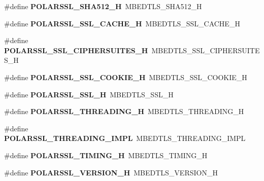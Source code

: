 \begin{DoxyCompactItemize}
\#define {\bfseries P\+O\+L\+A\+R\+S\+S\+L\+\_\+\+S\+H\+A512\+\_\+H}~M\+B\+E\+D\+T\+L\+S\+\_\+\+S\+H\+A512\+\_\+H
\item 
\mbox{\label{compat-1_83_8h_aece1c1276266697c379a684ac238a98d}} 
\#define {\bfseries P\+O\+L\+A\+R\+S\+S\+L\+\_\+\+S\+S\+L\+\_\+\+C\+A\+C\+H\+E\+\_\+H}~M\+B\+E\+D\+T\+L\+S\+\_\+\+S\+S\+L\+\_\+\+C\+A\+C\+H\+E\+\_\+H
\item 
\mbox{\label{compat-1_83_8h_ae147fcb915f29d083d09176982c3026c}} 
\#define {\bfseries P\+O\+L\+A\+R\+S\+S\+L\+\_\+\+S\+S\+L\+\_\+\+C\+I\+P\+H\+E\+R\+S\+U\+I\+T\+E\+S\+\_\+H}~M\+B\+E\+D\+T\+L\+S\+\_\+\+S\+S\+L\+\_\+\+C\+I\+P\+H\+E\+R\+S\+U\+I\+T\+E\+S\+\_\+H
\item 
\mbox{\label{compat-1_83_8h_a7978e5c11b25fb5b967f122985f721b6}} 
\#define {\bfseries P\+O\+L\+A\+R\+S\+S\+L\+\_\+\+S\+S\+L\+\_\+\+C\+O\+O\+K\+I\+E\+\_\+H}~M\+B\+E\+D\+T\+L\+S\+\_\+\+S\+S\+L\+\_\+\+C\+O\+O\+K\+I\+E\+\_\+H
\item 
\mbox{\label{compat-1_83_8h_ac3ad711afad5d44692f938326f7730b5}} 
\#define {\bfseries P\+O\+L\+A\+R\+S\+S\+L\+\_\+\+S\+S\+L\+\_\+H}~M\+B\+E\+D\+T\+L\+S\+\_\+\+S\+S\+L\+\_\+H
\item 
\mbox{\label{compat-1_83_8h_a31661790c7e4dc4fff08b1001a817fea}} 
\#define {\bfseries P\+O\+L\+A\+R\+S\+S\+L\+\_\+\+T\+H\+R\+E\+A\+D\+I\+N\+G\+\_\+H}~M\+B\+E\+D\+T\+L\+S\+\_\+\+T\+H\+R\+E\+A\+D\+I\+N\+G\+\_\+H
\item 
\mbox{\label{compat-1_83_8h_a2e5803bec081641bfa4c004de62dd360}} 
\#define {\bfseries P\+O\+L\+A\+R\+S\+S\+L\+\_\+\+T\+H\+R\+E\+A\+D\+I\+N\+G\+\_\+\+I\+M\+PL}~M\+B\+E\+D\+T\+L\+S\+\_\+\+T\+H\+R\+E\+A\+D\+I\+N\+G\+\_\+\+I\+M\+PL
\item 
\mbox{\label{compat-1_83_8h_af017d7fc811ccd4862998f4e813a68d5}} 
\#define {\bfseries P\+O\+L\+A\+R\+S\+S\+L\+\_\+\+T\+I\+M\+I\+N\+G\+\_\+H}~M\+B\+E\+D\+T\+L\+S\+\_\+\+T\+I\+M\+I\+N\+G\+\_\+H
\item 
\mbox{\label{compat-1_83_8h_ac0977c263ee06e39ab81bcf77e3a425f}} 
\#define {\bfseries P\+O\+L\+A\+R\+S\+S\+L\+\_\+\+V\+E\+R\+S\+I\+O\+N\+\_\+H}~M\+B\+E\+D\+T\+L\+S\+\_\+\+V\+E\+R\+S\+I\+O\+N\+\_\+H

\end{DoxyCompactItemize}
